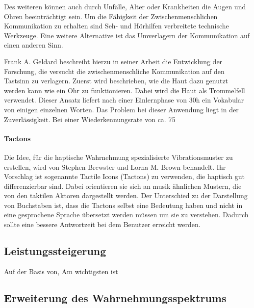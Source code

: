 \documentclass{llncs}					%
\begin{document}
Des weiteren können auch durch Unfälle, Alter oder Krankheiten die Augen und Ohren beeinträchtigt sein. Um die Fähigkeit der Zwischenmenschlichen Kommunikation zu erhalten sind Seh- und Hörhilfen verbreitete technische Werkzeuge. Eine weitere Alternative ist das Umverlagern der Kommunikation auf einen anderen Sinn\cite{10.2307/1705360}.

Frank A. Geldard \cite{10.2307/1705360} beschreibt hierzu in seiner Arbeit die Entwicklung der Forschung, die versucht die zwischenmenschliche Kommunikation auf den Tastsinn zu verlagern. Zuerst wird beschrieben, wie die Haut dazu genutzt werden kann wie ein Ohr zu funktionieren. Dabei wird die Haut als Trommelfell verwendet. Dieser Ansatz liefert nach einer Einlernphase von 30h ein Vokabular von einigen einzelnen Worten\cite{10.2307/1705360}. Das Problem bei dieser Anwendung liegt in der Zuverlässigkeit. Bei einer Wiederkennungsrate von ca. 75%

\paragraph{Tactons} Die Idee, für die haptische Wahrnehmung spezialisierte Vibrationsmuster zu erstellen, wird von Stephen Brewster und Lorna M. Brown\cite{Brewster:2004:TST:976310.976313} behandelt. Ihr Vorschlag ist sogenannte Tactile Icons (Tactons) zu verwenden, die haptisch gut differenzierbar sind. Dabei orientieren sie sich an musik ähnlichen Mustern, die von den taktilen Aktoren dargestellt werden\cite{Brewster:2004:TST:976310.976313}.
Der Unterschied zu der Darstellung von Buchstaben ist, dass die Tactons selbst eine Bedeutung haben und nicht in eine gesprochene Sprache übersetzt werden müssen um sie zu verstehen. Dadurch sollte eine bessere Antwortzeit bei dem Benutzer erreicht werden.

\subsection{Leistungssteigerung}

Auf der Basis von\cite{rupert2000instrumentation},\cite{calhoun2002utilty}
Am wichtigsten ist \cite{lieberman2007development}

\subsection{Erweiterung des Wahrnehmungsspektrums}
\end{document}
